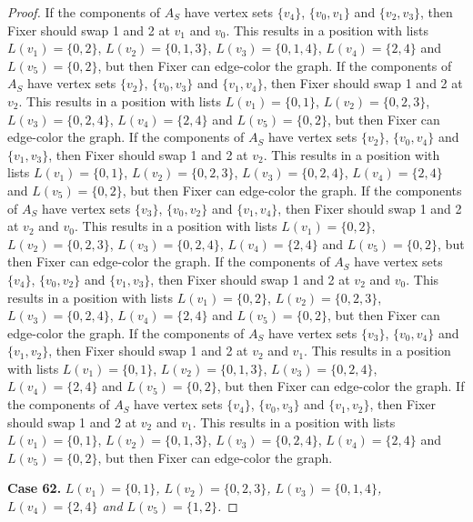 \documentclass[12pt]{amsart}
\theoremstyle{plain}
\theoremstyle{definition}
\theoremstyle{remark}
\begin{document}
\begin{proof}
If the components of $A_S$ have vertex sets $\{v_4\}$, $\{v_0, v_1\}$ and $\{v_2, v_3\}$, then Fixer should swap 1 and 2 at $v_1$ and $v_0$. This results in a position with lists $L(v_1) = \{0, 2\}$, $L(v_2) = \{0, 1, 3\}$, $L(v_3) = \{0, 1, 4\}$, $L(v_4) = \{2, 4\}$ and $L(v_5) = \{0, 2\}$, but then Fixer can edge-color the graph.
If the components of $A_S$ have vertex sets $\{v_2\}$, $\{v_0, v_3\}$ and $\{v_1, v_4\}$, then Fixer should swap 1 and 2 at $v_2$. This results in a position with lists $L(v_1) = \{0, 1\}$, $L(v_2) = \{0, 2, 3\}$, $L(v_3) = \{0, 2, 4\}$, $L(v_4) = \{2, 4\}$ and $L(v_5) = \{0, 2\}$, but then Fixer can edge-color the graph.
If the components of $A_S$ have vertex sets $\{v_2\}$, $\{v_0, v_4\}$ and $\{v_1, v_3\}$, then Fixer should swap 1 and 2 at $v_2$. This results in a position with lists $L(v_1) = \{0, 1\}$, $L(v_2) = \{0, 2, 3\}$, $L(v_3) = \{0, 2, 4\}$, $L(v_4) = \{2, 4\}$ and $L(v_5) = \{0, 2\}$, but then Fixer can edge-color the graph.
If the components of $A_S$ have vertex sets $\{v_3\}$, $\{v_0, v_2\}$ and $\{v_1, v_4\}$, then Fixer should swap 1 and 2 at $v_2$ and $v_0$. This results in a position with lists $L(v_1) = \{0, 2\}$, $L(v_2) = \{0, 2, 3\}$, $L(v_3) = \{0, 2, 4\}$, $L(v_4) = \{2, 4\}$ and $L(v_5) = \{0, 2\}$, but then Fixer can edge-color the graph.
If the components of $A_S$ have vertex sets $\{v_4\}$, $\{v_0, v_2\}$ and $\{v_1, v_3\}$, then Fixer should swap 1 and 2 at $v_2$ and $v_0$. This results in a position with lists $L(v_1) = \{0, 2\}$, $L(v_2) = \{0, 2, 3\}$, $L(v_3) = \{0, 2, 4\}$, $L(v_4) = \{2, 4\}$ and $L(v_5) = \{0, 2\}$, but then Fixer can edge-color the graph.
If the components of $A_S$ have vertex sets $\{v_3\}$, $\{v_0, v_4\}$ and $\{v_1, v_2\}$, then Fixer should swap 1 and 2 at $v_2$ and $v_1$. This results in a position with lists $L(v_1) = \{0, 1\}$, $L(v_2) = \{0, 1, 3\}$, $L(v_3) = \{0, 2, 4\}$, $L(v_4) = \{2, 4\}$ and $L(v_5) = \{0, 2\}$, but then Fixer can edge-color the graph.
If the components of $A_S$ have vertex sets $\{v_4\}$, $\{v_0, v_3\}$ and $\{v_1, v_2\}$, then Fixer should swap 1 and 2 at $v_2$ and $v_1$. This results in a position with lists $L(v_1) = \{0, 1\}$, $L(v_2) = \{0, 1, 3\}$, $L(v_3) = \{0, 2, 4\}$, $L(v_4) = \{2, 4\}$ and $L(v_5) = \{0, 2\}$, but then Fixer can edge-color the graph.

\noindent\textbf{Case 62.  }\textit{$L(v_1) = \{0, 1\}$, $L(v_2) = \{0, 2, 3\}$, $L(v_3) = \{0, 1, 4\}$, $L(v_4) = \{2, 4\}$ and $L(v_5) = \{1, 2\}$.}


\end{proof}
\end{document}
